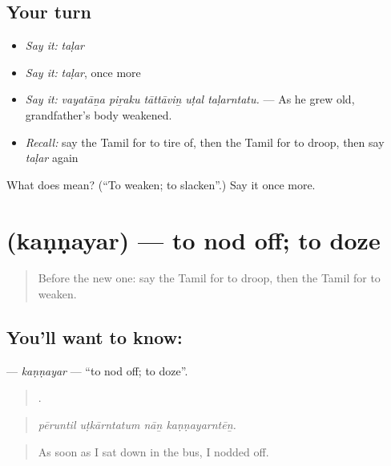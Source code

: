 \subsection*{Your turn}
\begin{itemize}
\raggedright
  \item \emph{Say it:} \emph{taḷar}
  \item \emph{Say it:} \emph{taḷar}, once more
  \item \emph{Say it:} \emph{vayatāṉa piṟaku tāttāviṉ uṭal taḷarntatu.} — As he grew old, grandfather’s body weakened.
  \item \emph{Recall:} say the Tamil for to tire of, then the Tamil for to droop, then say \emph{taḷar} again
\end{itemize}

\begin{tcolorbox}[breakable,colback=teal!4,colframe=teal!35!black,title={Before you move on}]
What does  mean? (\textquotedblleft{}To weaken; to slacken\textquotedblright{}.) Say it once more.
\end{tcolorbox}
\section[\texorpdfstring{\ta{கண்ணயர்} (kaṇṇayar)}{கண்ணயர் (kaṇṇayar)}]{ (kaṇṇayar) — to nod off; to doze}

\label{lesson:TA-C468-kannayar}



\begin{quote}
Before the new one: say the Tamil for to droop, then the Tamil for to weaken.
\end{quote}

\subsection*{You'll want to know: }
\textbf{} — \emph{kaṇṇayar} — \textquotedblleft{}to nod off; to doze\textquotedblright{}.

\begin{quote}
   .
\end{quote}

\begin{quote}
\emph{pēruntil uṭkārntatum nāṉ kaṇṇayarntēṉ.}
\end{quote}

\begin{quote}
As soon as I sat down in the bus, I nodded off.
\end{quote}

